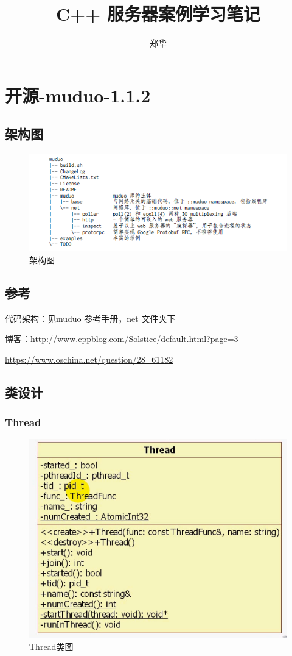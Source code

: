 \documentclass[UTF8,a4paper,8pt]{ctexbook}
\author{郑华}
\title{C++  服务器案例学习笔记}
\begin{document}
 	\maketitle
 	\tableofcontents
\chapter{开源-muduo-1.1.2}	
	 \section{架构图}
		 \begin{figure}[h]
		 	\centering
		 	\includegraphics[scale = 0.7]{muduo.png}
		 	\caption{架构图}
		 \end{figure}
 
	 \section{参考}
		 代码架构：见muduo 参考手册，net 文件夹下
		 
		 博客：\url{http://www.cppblog.com/Solstice/default.html?page=3}
		 
			 \url{https://www.oschina.net/question/28_61182}
			 
	\section{类设计}
		\subsection{Thread}
			\begin{figure}[ht]
				\centering
				\includegraphics[scale= 0.3]{figure/muduoThread.png}
				\caption{Thread类图}
			\end{figure}
			
\end{document}
